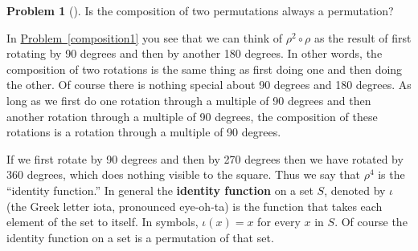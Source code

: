 \documentclass[10pt,]{book}
\newcommand{\terminology}[1]{\textbf{#1}}
\theoremstyle{plain}
\theoremstyle{definition}
\newtheorem{activity}[project]{Problem}
\theoremstyle{definition}
\numberwithin{equation}{chapter}
\begin{document}
\begin{activity}[] \label{activity-249}
Is the composition of two permutations always a permutation?%
\end{activity}
In \hyperref[composition1]{Problem~\ref{composition1}} you see that we can think of \(\rho^2\circ\rho\) as the result of first rotating by 90 degrees and then by another 180 degrees. In other words, the composition of two rotations is the same thing as first doing one and then doing the other. Of course there is nothing special about 90 degrees and 180 degrees.  As long as we first do one rotation through a multiple of 90 degrees and then another rotation through a multiple of 90 degrees, the composition of these rotations is a rotation through a multiple of 90 degrees.%
\par
If we first rotate by 90 degrees and then by 270 degrees then we have rotated by 360 degrees, which does nothing visible to the square. Thus we say that \(\rho^4\) is the ``identity function.'' In general the \terminology{identity function} on a set \(S\), denoted by \(\iota\) (the Greek letter iota, pronounced eye-oh-ta) is the function that takes each element of the set to itself. In symbols, \(\iota(x) =x\) for every \(x\) in \(S\). Of course the identity function on a set is a permutation of that set.%
\typeout{************************************************}
\typeout{************************************************}
\end{document}
